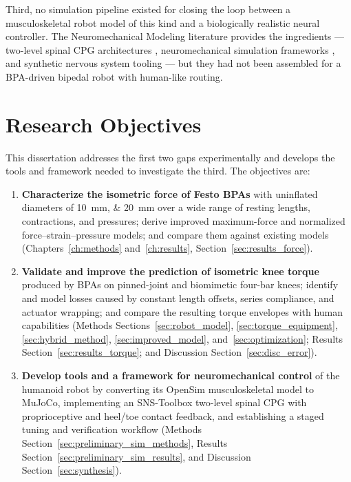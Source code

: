 Third, no simulation pipeline existed for closing the loop between a musculoskeletal robot model of this kind and a biologically realistic neural controller. The Neuromechanical Modeling literature provides the ingredients --- two-level spinal CPG architectures \citep{rybak_modelling_2006, mccrea_organization_2008}, neuromechanical simulation frameworks \citep{markin_afferent_2010}, and synthetic nervous system tooling \citep{nourse_sns_2023} --- but they had not been assembled for a BPA-driven bipedal robot with human-like routing.


\section{Research Objectives}\label{sec:objectives}


This dissertation addresses the first two gaps experimentally and develops the tools and framework needed to investigate the third. The objectives are:

\begin{enumerate}
    \item \textbf{Characterize the isometric force of Festo BPAs} with uninflated diameters of \qtylist{10;20}{\mm} over a wide range of resting lengths, contractions, and pressures; derive improved maximum-force and normalized force--strain--pressure models; and compare them against existing models (Chapters~\ref{ch:methods} and~\ref{ch:results}, Section~\ref{sec:results_force}).
    
    \item \textbf{Validate and improve the prediction of isometric knee torque} produced by BPAs on pinned-joint and biomimetic four-bar knees; identify and model losses caused by constant length offsets, series compliance, and actuator wrapping; and compare the resulting torque envelopes with human capabilities (Methods Sections~\ref{sec:robot_model}, \ref{sec:torque_equipment}, \ref{sec:hybrid_method}, \ref{sec:improved_model}, and~\ref{sec:optimization}; Results Section~\ref{sec:results_torque}; and Discussion Section~\ref{sec:disc_error}).

    \item \textbf{Develop tools and a framework for neuromechanical control} of the humanoid robot by converting its OpenSim musculoskeletal model to MuJoCo, implementing an SNS-Toolbox two-level spinal CPG with proprioceptive and heel/toe contact feedback, and establishing a staged tuning and verification workflow (Methods Section~\ref{sec:preliminary_sim_methods}, Results Section~\ref{sec:preliminary_sim_results}, and Discussion Section~\ref{sec:synthesis}).

\end{enumerate}

